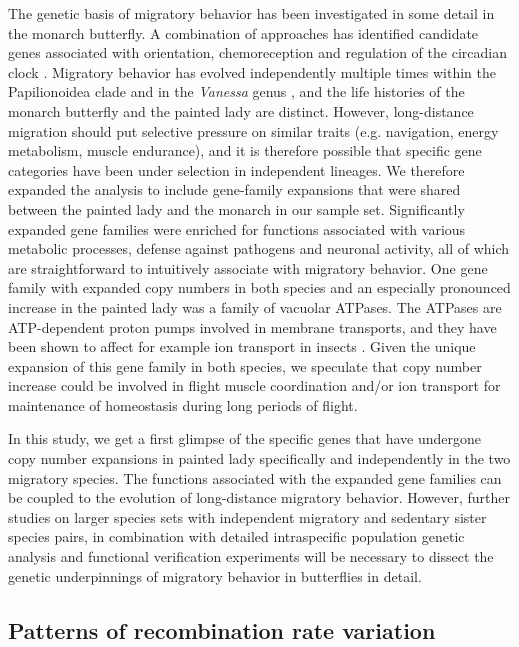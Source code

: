 \documentclass[twocolumn]{bmcart}%
\begin{document}
The genetic basis of migratory behavior has been investigated in some detail in the monarch butterfly. A combination of approaches has identified candidate genes associated with orientation, chemoreception and regulation of the circadian clock \cite{zhanGeneticsMonarchButterfly2014, zhuDefiningBehavioralMolecular2009}. Migratory behavior has evolved independently multiple times within the Papilionoidea clade \cite{chowdhuryMigrationButterfliesGlobal2021} and in the \textit{Vanessa} genus \cite{wahlbergVagilityVanessaLepidoptera2011}, and the life histories of the monarch butterfly and the painted lady are distinct. However, long-distance migration should put selective pressure on similar traits (e.g. navigation, energy metabolism, muscle endurance), and it is therefore possible that specific gene categories have been under selection in independent lineages. We therefore expanded the analysis to include gene-family expansions that were shared between the painted lady and the monarch in our sample set. Significantly expanded gene families were enriched for functions associated with various metabolic processes, defense against pathogens and neuronal activity, all of which are straightforward to intuitively associate with migratory behavior. One gene family with expanded copy numbers in both species and an especially pronounced increase in the painted lady was a family of vacuolar ATPases. The ATPases are ATP-dependent proton pumps involved in membrane transports, and they have been shown to affect for example ion transport in insects \cite{wieczorekVacuolartypeProtonPumps2009}. Given the unique expansion of this gene family in both species, we speculate that copy number increase could be involved in flight muscle coordination and/or ion transport for maintenance of homeostasis during long periods of flight.

In this study, we get a first glimpse of the specific genes that have undergone copy number expansions in painted lady specifically and independently in the two migratory species. The functions associated with the expanded gene families can be coupled to the evolution of long-distance migratory behavior. However, further studies on larger species sets with independent migratory and sedentary sister species pairs, in combination with detailed intraspecific population genetic analysis and functional verification experiments will be necessary to dissect the genetic underpinnings of migratory behavior in butterflies in detail.

\subsection*{Patterns of recombination rate variation}
\end{document}
